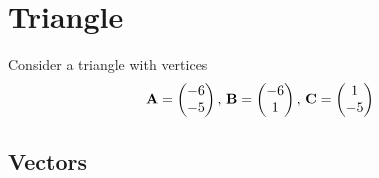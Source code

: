 \documentclass[11pt]{book}
\begin{document}
\frontmatter



\tableofcontents

\setcounter{page}{0}

\mainmatter

\chapter{Triangle}
Consider a triangle with vertices
\begin{align}
\mathbf{A} = \begin{pmatrix} -6 \\ -5\end{pmatrix},\,
\mathbf{B} = \begin{pmatrix}-6 \\ 1\end{pmatrix},\,
\mathbf{C} = \begin{pmatrix}1 \\ -5\end{pmatrix}
\end{align}

\section{Vectors}
\end{document}
